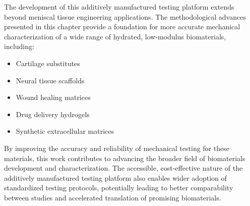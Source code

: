 The development of this additively manufactured testing platform extends beyond meniscal tissue engineering applications. The methodological advances presented in this chapter provide a foundation for more accurate mechanical characterization of a wide range of hydrated, low-modulus biomaterials, including:
\begin{itemize}
    \item Cartilage substitutes
    \item Neural tissue scaffolds
    \item Wound healing matrices
    \item Drug delivery hydrogels
    \item Synthetic extracellular matrices
\end{itemize}

By improving the accuracy and reliability of mechanical testing for these materials, this work contributes to advancing the broader field of biomaterials development and characterization. The accessible, cost-effective nature of the additively manufactured testing platform also enables wider adoption of standardized testing protocols, potentially leading to better comparability between studies and accelerated translation of promising biomaterials.

